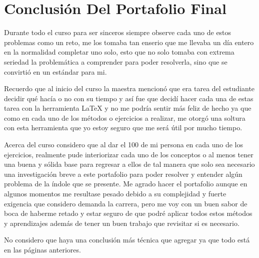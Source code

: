 \documentclass{article}
\begin{document}
\section*{Conclusión Del Portafolio Final}
Durante todo el curso para ser sinceros siempre observe cada uno de estos problemas como un reto,
me los tomaba tan enserio que me llevaba un día entero en la normalidad completar uno solo, esto que
no solo tomaba con extrema seriedad la problemática a comprender para poder resolverla, sino que se convirtió en un
estándar para mi.


Recuerdo que al inicio del curso la maestra mencionó que era tarea del estudiante decidir qué hacía o no con su tiempo y
así fue que decidí hacer cada una de estas tarea con la herramienta LaTeX y no me podría sentir más feliz de
hecho ya que como en cada uno de los métodos o ejercicios a realizar, me otorgó una soltura con esta herramienta que
yo estoy seguro que me será útil por mucho tiempo.


Acerca del curso considero que al dar el 100 de mi persona en cada uno de los ejercicios, realmente pude interiorizar
cada uno de los conceptos o al menos tener una buena y sólida base para regresar a ellos de tal manera que solo sea necesario una
investigación breve a este portafolio para poder resolver y entender algún problema de la índole que se presente.
Me agrado hacer el portafolio aunque en algunos momentos me resultase pesado debido a su complejidad y fuerte exigencia
que considero demanda la carrera, pero me voy con un buen sabor de boca de haberme retado y estar seguro de que podré aplicar todos
estos métodos y aprendizajes además de tener un buen trabajo que revisitar si es necesario.


No considero que haya una conclusión más técnica que agregar ya que todo está en las páginas anteriores.
\end{document}
